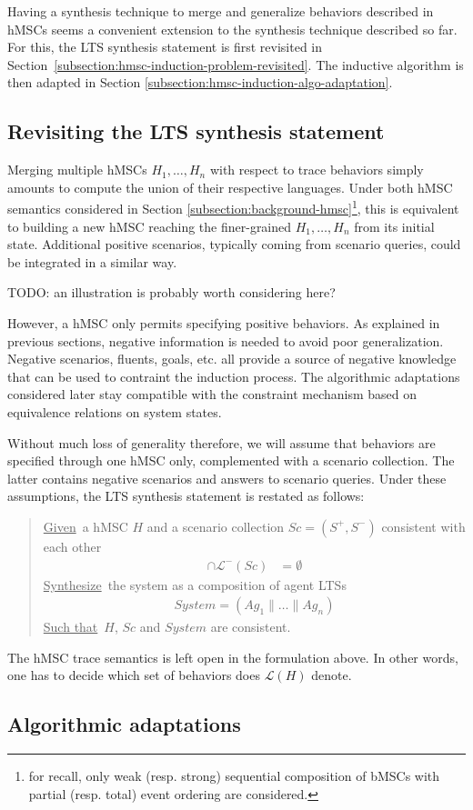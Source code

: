 Having a synthesis technique to merge and generalize behaviors described in hMSCs seems a convenient extension to the synthesis technique described so far. For this, the LTS synthesis statement is first revisited in Section~\ref{subsection:hmsc-induction-problem-revisited}. The inductive algorithm is then adapted in Section \ref{subsection:hmsc-induction-algo-adaptation}.

\subsection{Revisiting the LTS synthesis statement\label{subsection:hmsc-induction-problem-revisited}}

Merging multiple hMSCs $H_1,\ldots,H_n$ with respect to trace behaviors simply amounts to compute the union of their respective languages. Under both hMSC semantics considered in Section \ref{subsection:background-hmsc}\footnote{for recall, only weak (resp. strong) sequential composition of bMSCs with partial (resp. total) event ordering are considered.}, this is equivalent to building a new hMSC reaching the finer-grained $H_1,\ldots,H_n$ from its initial state. Additional positive scenarios, typically coming from scenario queries, could be integrated in a similar way.

TODO: an illustration is probably worth considering here?

However, a hMSC only permits specifying positive behaviors. As explained in previous sections, negative information is needed to avoid poor generalization. Negative scenarios, fluents, goals, etc. all provide a source of negative knowledge that can be used to contraint the induction process. The algorithmic adaptations considered later stay compatible with the constraint mechanism based on equivalence relations on system states.

Without much loss of generality therefore, we will assume that behaviors are specified through one hMSC only, complemented with a scenario collection. The latter contains negative scenarios and answers to scenario queries. Under these assumptions, the LTS synthesis statement is restated as follows: 

\begin{quote}
\underline{Given}~a hMSC $H$ and a scenario collection $Sc = (S^+,S^-)$ consistent with each other
\begin{align*}
[\mathcal{L}^+(Sc) \cup \mathcal{L}(H)] \cap \mathcal{L}^-(Sc) &= \emptyset
\end{align*}
\underline{Synthesize}~the system as a composition of agent LTSs
\begin{align*}
System = (Ag_1 \parallel \ldots \parallel Ag_n)
\end{align*}
\underline{Such that}~$H$, $Sc$ and $System$ are consistent.
\end{quote}

The hMSC trace semantics is left open in the formulation above. In other words, one has to decide which set of behaviors does $\mathcal{L}(H)$ denote. 

\subsection{Algorithmic adaptations\label{subsection:hmsc-induction-algo-adaptation}}


